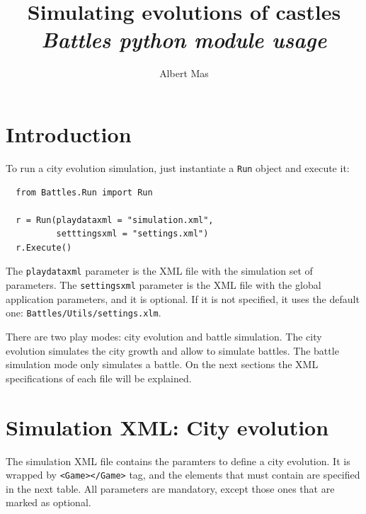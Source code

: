 \documentclass[tog]{acmsiggraph}
\title{Simulating evolutions of castles \\ \textit{Battles python module usage}}
\author{Albert Mas}
\begin{document}
 
\maketitle
 

 
\section{Introduction}

To run a city evolution simulation, just instantiate a \texttt{Run} object and execute it:

\begin{verbatim}
  from Battles.Run import Run 
 
  r = Run(playdataxml = "simulation.xml",
          setttingsxml = "settings.xml")
  r.Execute()
\end{verbatim} 

The \texttt{playdataxml} parameter is the XML file with the simulation set of parameters. 
The \texttt{settingsxml} parameter is the XML file with the global application parameters, and it is optional. 
If it is not specified, it uses the default one: \texttt{Battles/Utils/settings.xlm}.

There are two play modes: city evolution and battle simulation.
The city evolution simulates the city growth and allow to simulate battles.
The battle simulation mode only simulates a battle.
On the next sections the XML specifications of each file will be explained.



\section{Simulation XML: City evolution}

The simulation XML file contains the paramters to define a city evolution. 
It is wrapped by \texttt{<Game></Game>} tag, and the elements that must contain are specified in the next table. 
All parameters are mandatory, except those ones that are marked as optional.
\end{document}
